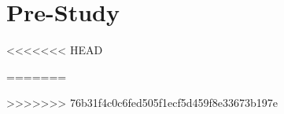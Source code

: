 \section{Pre-Study}
    
	
	
	
    
    
	
	
	
<<<<<<< HEAD
    
=======
	
	
>>>>>>> 76b31f4c0c6fed505f1ecf5d459f8e33673b197e

